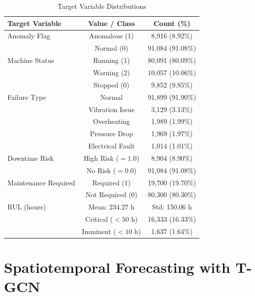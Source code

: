 \begin{table}[!htbp]
\centering
\caption{Target Variable Distributions}
\label{tab:tgt_st}
\begin{tabular}{lcc}
\hline
\textbf{Target Variable} & \textbf{Value / Class} & \textbf{Count (\%)} \\
\hline
Anomaly Flag         & Anomalous (1)            & 8,916 (8.92\%)  \\
                     & Normal (0)               & 91,084 (91.08\%) \\
\hline
Machine Status       & Running (1)              & 80,091 (80.09\%) \\
                     & Warning (2)              & 10,057 (10.06\%) \\
                     & Stopped (0)              & 9,852 (9.85\%)  \\
\hline
Failure Type         & Normal                   & 91,899 (91.90\%) \\
                     & Vibration Issue          & 3,129 (3.13\%)  \\
                     & Overheating              & 1,989 (1.99\%)  \\
                     & Pressure Drop            & 1,969 (1.97\%)  \\
                     & Electrical Fault         & 1,014 (1.01\%)  \\
\hline
Downtime Risk        & High Risk ($= 1.0$)      & 8,904 (8.90\%)  \\
                     & No Risk ($= 0.0$)        & 91,084 (91.08\%) \\
\hline
Maintenance Required & Required (1)             & 19,700 (19.70\%) \\
                     & Not Required (0)         & 80,300 (80.30\%) \\
\hline
RUL (hours)          & Mean: 234.27 h           & Std: 150.06 h   \\
                     & Critical ($< 50$ h)      & 16,333 (16.33\%) \\
                     & Imminent ($< 10$ h)      & 1,637 (1.64\%)  \\
\hline
\end{tabular}
\end{table}


\section{Spatiotemporal Forecasting with T-GCN}

